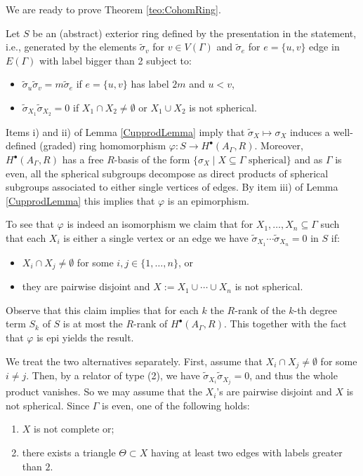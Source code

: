 \documentclass[10pt, oneside]{amsart}
\theoremstyle{definition}
\theoremstyle{remark}
\theoremstyle{plain}
\begin{document}
We are ready to prove Theorem \ref{teo:CohomRing}.

 \bigskip

 Let $S$ be an (abstract) exterior ring defined by the presentation in the statement, i.e., generated by the elements $\tilde\sigma_v$ for $v\in V(\Gamma)$ and $\tilde\sigma_e$ for $e=\{u,v\}$ edge in $E(\Gamma)$ with label bigger than 2 subject to:
\begin{itemize}
\item[(1)] $\tilde\sigma_u\tilde\sigma_v=m\tilde\sigma_e$ if $e=\{u,v\}$ has label $2m$ and $u<v$,
\item[(2)] $\tilde\sigma_{X_1}\tilde\sigma_{X_2}=0$ if $X_1\cap X_2\neq\emptyset$ or $X_1\cup X_2$ is not spherical. 
\end{itemize}
Items i) and ii) of Lemma \ref{CupprodLemma} imply that $\tilde\sigma_X\mapsto\sigma_X$ induces a well-defined (graded) ring homomorphism $\varphi:S\to H^\bullet(A_\Gamma,R)$. Moreover, $H^\bullet(A_\Gamma,R)$ has a free $R$-basis of the form $\{\sigma_X\mid X\subseteq\Gamma\text{ spherical}\}$ and as $\Gamma$ is even, all the spherical subgroups decompose as direct products of spherical subgroups associated to either single vertices of edges. By item iii) of Lemma \ref{CupprodLemma} this implies that $\varphi$ is an epimorphism.

To see that $\varphi$ is indeed an isomorphism we claim that for $X_1,\dots,X_n\subseteq\Gamma$ such that each $X_i$ is either a single vertex or an edge we have 
	$\tilde\sigma_{X_1}\cdots\tilde\sigma_{X_n}=0$ in $S$ if:
	\begin{itemize}
		\item $X_i\cap X_j\neq\emptyset$ for some $i,j\in\{1,\dots,n\}$, or
        \item they are pairwise disjoint and $X:=X_1\cup\cdots\cup X_n$ is not spherical.
	\end{itemize}
Observe that this claim implies that for each $k$ the $R$-rank of the $k$-th degree term $S_k$ of $S$ is at most the $R$-rank of $H^\bullet(A_\Gamma,R)$. This together with the fact that $\varphi$ is epi yields the result.

	We treat the two alternatives separately. First, assume that $X_i\cap X_j\neq\emptyset$ for some $i\neq j$.
	Then, by a relator of type (2), we have
	$\tilde\sigma_{X_i}\tilde\sigma_{X_j}=0$, and thus the whole product vanishes. So we may assume that the $X_i$'s are pairwise disjoint and $X$ is not spherical. Since $\Gamma$ is even, one of the following holds:
	\begin{enumerate}
		\item[i)] $X$ is not complete or;
		\item[ii)] there exists a triangle $\Theta\subset X$ having at least two edges
		with labels greater than $2$.
	\end{enumerate}
	
\end{document}
